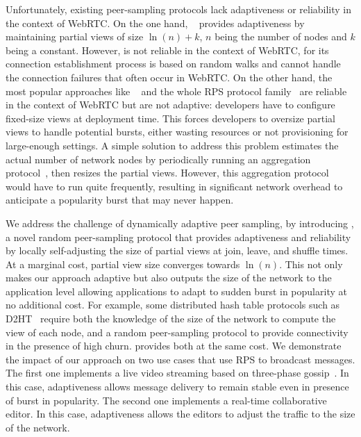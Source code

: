 Unfortunately, existing peer-sampling protocols lack adaptiveness or
reliability in the context of WebRTC. On the one hand,
\SCAMP~\cite{ganesh2001scamp,ganesh2003peer} provides adaptiveness by
maintaining partial views of size $\ln(n)+k$, $n$ being the number of
nodes and $k$ being a constant. However, \SCAMP is not reliable in the
context of WebRTC, for its connection establishment process is based
on random walks and cannot handle the connection failures that often
occur in WebRTC. On the other hand, the most popular approaches like
\CYCLON~\cite{voulgaris2005cyclon} and the whole RPS protocol
family~\cite{jelasity2007gossip} are reliable in the context of WebRTC
but are not adaptive: developers have to configure fixed-size views at
deployment time. This forces developers to oversize partial views to
handle potential bursts, either wasting resources or not provisioning
for large-enough settings. A simple solution to address this problem
estimates the actual number of network nodes by periodically running
an aggregation protocol~\cite{montresor2004robust}, then resizes the
partial views. However, this aggregation protocol would have to run
quite frequently, resulting in significant network overhead to
anticipate a popularity burst that may never happen. 

We address the challenge of dynamically adaptive peer sampling, by
introducing \SPRAY, a novel random peer-sampling protocol that
provides adaptiveness and reliability by locally self-adjusting the
size of partial views at join, leave, and shuffle times. At a marginal
cost, partial view size converges towards $\ln(n)$. This not only
makes our approach adaptive but also outputs the size of the network
to the application level allowing applications to adapt to sudden
burst in popularity at no additional cost.  For example, some
distributed hash table protocols such as D2HT~\cite{bertier-d2ht}
require both the knowledge of the size of the network to compute the
view of each node, and a random peer-sampling protocol to provide
connectivity in the presence of high churn. \SPRAY provides both at
the same cost.  We demonstrate the impact of our approach on two use
cases that use RPS to broadcast messages. The first one implements a
live video streaming based on three-phase
gossip~\cite{Frey09DSN,FlightPath,monod:THESIS}. In this case,
adaptiveness allows message delivery to remain stable even in presence
of burst in popularity. The second one implements a real-time
collaborative editor. In this case, adaptiveness allows the editors to
adjust the traffic to the size of the network.




